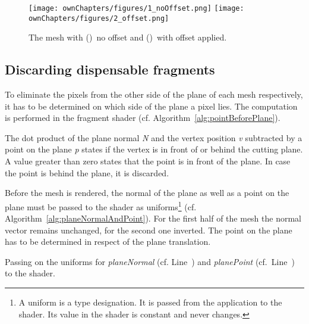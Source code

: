 \begin{figure}%
\centering
{}
	{\texttt{[image: ownChapters/figures/1\_noOffset.png]}}
	{\texttt{[image: ownChapters/figures/2\_offset.png]}}
\caption{The mesh with ()~no offset and ()~with offset applied.}%
\label{fig:offsetTypes}%
\end{figure}

\subsection{Discarding dispensable fragments}
To eliminate the pixels from the other side of the plane of each mesh respectively, it has to be determined on which side of the plane a pixel lies. The computation is performed in the fragment shader (cf. Algorithm~\ref{alg:pointBeforePlane}).

\begin{algorithm}
 {\;}
\caption{The dot product of the plane normal \emph{N} and the vertex position \emph{v} subtracted by a point on the plane \emph{p} states if the vertex is in front of or behind the cutting plane. A value greater than zero states that the point is in front of the plane. In case the point is behind the plane, it is discarded.}
\BlankLine
\label{alg:pointBeforePlane}
\end{algorithm}

Before the mesh is rendered, the normal of the plane as well as a point on the plane must be passed to the shader as uniforms\footnote{A uniform is a type designation. It is passed from the application to the shader. Its value in the shader is constant and never changes.} (cf. Algorithm~\ref{alg:planeNormalAndPoint}). For the first half of the mesh the normal vector remains unchanged, for the second one inverted. The point on the plane has to be determined in respect of the plane translation.
\LinesNumbered
\begin{algorithm}
\;\label{ln:planeN}
\;\label{ln:planeP}
\BlankLine
\caption{Passing on the uniforms for \emph{planeNormal} (cf. Line~\NlSty{\ref{ln:planeN}}) and \emph{planePoint} (cf.~Line~\NlSty{\ref{ln:planeP}}) to the shader.}
\label{alg:planeNormalAndPoint}
\end{algorithm}
\LinesNotNumbered

